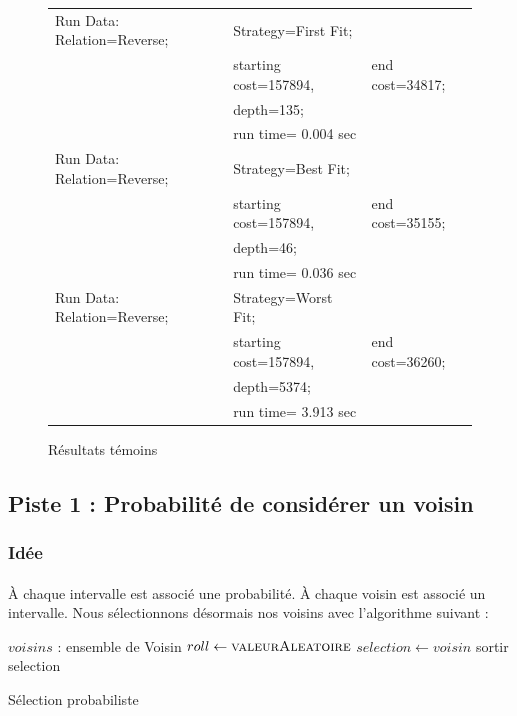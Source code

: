 \documentclass[a4paper,10pt]{report}
\begin{document}
\begin{figure}[h]
  \begin{tabular}{lll}
    Run Data: Relation=Reverse;&
      Strategy=First Fit;\\
      &starting cost=157894,&
      end cost=34817;\\
      &depth=135;\\
      &run time= 0.004 sec\\
    Run Data: Relation=Reverse;&
      Strategy=Best Fit;\\
      &starting cost=157894,&
      end cost=35155;\\
      &depth=46;\\
      &run time= 0.036 sec\\
    Run Data: Relation=Reverse;&
      Strategy=Worst Fit;\\
      &starting cost=157894,&
      end cost=36260;\\
      &depth=5374;\\
      &run time= 3.913 sec\\
  \end{tabular}
  \caption{Résultats témoins}
\end{figure}


\subsection{Piste 1 : Probabilité de considérer un voisin}
\subsubsection{Idée}

\paragraph{}
À chaque intervalle est associé une probabilité. À chaque voisin est associé un
intervalle. Nous sélectionnons désormais nos voisins avec l'algorithme suivant :

\begin{algorithm}[h]
  \begin{algorithmic}
    \Require $voisins$ : ensemble de Voisin
      \State $roll\gets \Call{valeurAleatoire}{}$
	\State $selection \gets voisin$
	\State sortir
      \EndIf
    \EndFor
      \Return selection
    \EndIf
  \end{algorithmic}
  \caption{Sélection probabiliste}
\end{algorithm}
\end{document}
